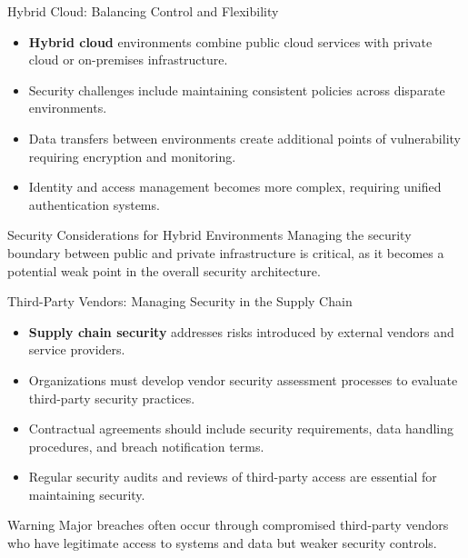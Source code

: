 \documentclass{beamer}
\begin{document}
\begin{frame}{Hybrid Cloud: Balancing Control and Flexibility}
\begin{itemize}
\item \textbf{Hybrid cloud} environments combine public cloud services with private cloud or on-premises infrastructure.
\item Security challenges include maintaining consistent policies across disparate environments.
\item Data transfers between environments create additional points of vulnerability requiring encryption and monitoring.
\item Identity and access management becomes more complex, requiring unified authentication systems.
\end{itemize}

\begin{block}{Security Considerations for Hybrid Environments}
Managing the security boundary between public and private infrastructure is critical, as it becomes a potential weak point in the overall security architecture.
\end{block}
\end{frame}

\begin{frame}{Third-Party Vendors: Managing Security in the Supply Chain}
\begin{itemize}
\item \textbf{Supply chain security} addresses risks introduced by external vendors and service providers.
\item Organizations must develop vendor security assessment processes to evaluate third-party security practices.
\item Contractual agreements should include security requirements, data handling procedures, and breach notification terms.
\item Regular security audits and reviews of third-party access are essential for maintaining security.
\end{itemize}

\begin{alertblock}{Warning}
Major breaches often occur through compromised third-party vendors who have legitimate access to systems and data but weaker security controls.
\end{alertblock}
\end{frame}
\end{document}
